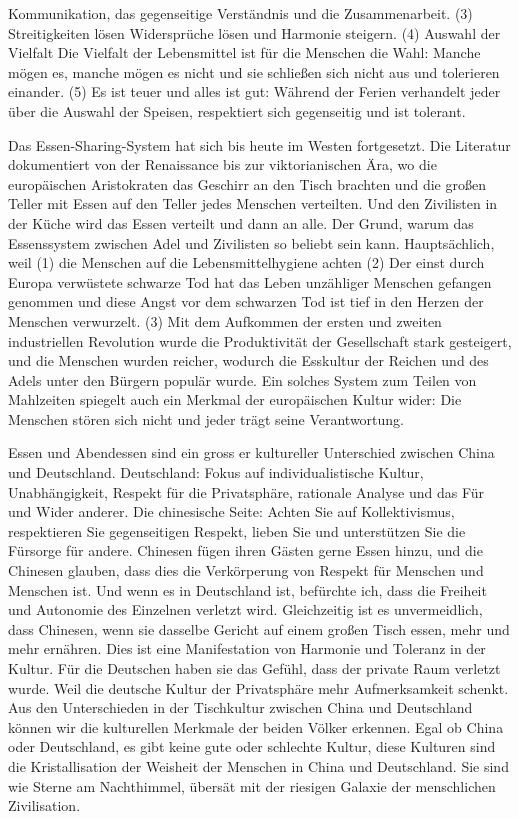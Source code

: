 Kommunikation, das gegenseitige Verständnis und die Zusammenarbeit. (3) Streitigkeiten lösen Widersprüche lösen und Harmonie steigern. (4) Auswahl der Vielfalt Die Vielfalt der Lebensmittel ist für die Menschen die Wahl: Manche mögen es, manche mögen es nicht und sie schließen sich nicht aus und tolerieren einander. (5) Es ist teuer und alles ist gut: Während der Ferien verhandelt jeder über die Auswahl der Speisen, respektiert sich gegenseitig und ist tolerant.
\par
Das Essen-Sharing-System hat sich bis heute im Westen fortgesetzt. Die Literatur dokumentiert von der Renaissance bis zur viktorianischen Ära, wo die europäischen Aristokraten das Geschirr an den Tisch brachten und die großen Teller mit Essen auf den Teller jedes Menschen verteilten. Und den Zivilisten in der Küche wird das Essen verteilt und dann an alle. Der Grund, warum das Essenssystem zwischen Adel und Zivilisten so beliebt sein kann. Hauptsächlich, weil (1) die Menschen auf die Lebensmittelhygiene achten (2) Der einst durch Europa verwüstete schwarze Tod hat das Leben unzähliger Menschen gefangen genommen und diese Angst vor dem schwarzen Tod ist tief in den Herzen der Menschen verwurzelt. (3) Mit dem Aufkommen der ersten und zweiten industriellen Revolution wurde die Produktivität der Gesellschaft stark gesteigert, und die Menschen wurden reicher, wodurch die Esskultur der Reichen und des Adels unter den Bürgern populär wurde. Ein solches System zum Teilen von Mahlzeiten spiegelt auch ein Merkmal der europäischen Kultur wider: Die Menschen stören sich nicht und jeder trägt seine Verantwortung.
\par
Essen und Abendessen sind ein gro\-ss er kultureller Unterschied zwischen China und Deutschland. Deutschland: Fokus auf individualistische Kultur, Unabhängigkeit, Respekt für die Privatsphäre, rationale Analyse und das Für und Wider anderer. Die chinesische Seite: Achten Sie auf Kollektivismus, respektieren Sie gegenseitigen Respekt, lieben Sie und unterstützen Sie die Fürsorge für andere. Chinesen fügen ihren Gästen gerne Essen hinzu, und die Chinesen glauben, dass dies die Verkörperung von Respekt für Menschen und Menschen ist. Und wenn es in Deutschland ist, befürchte ich, dass die Freiheit und Autonomie des Einzelnen verletzt wird. Gleichzeitig ist es unvermeidlich, dass Chinesen, wenn sie dasselbe Gericht auf einem großen Tisch essen, mehr und mehr ernähren. Dies ist eine Manifestation von Harmonie und Toleranz in der Kultur. Für die Deutschen haben sie das Gefühl, dass der private Raum verletzt wurde. Weil die deutsche Kultur der Privatsphäre mehr Aufmerksamkeit schenkt.
Aus den Unterschieden in der Tischkultur zwischen China und Deutschland können wir die kulturellen Merkmale der beiden Völker erkennen. Egal ob China oder Deutschland, es gibt keine gute oder schlechte Kultur, diese Kulturen sind die Kristallisation der Weisheit der Menschen in China und Deutschland. Sie sind wie Sterne am Nachthimmel, übersät mit der riesigen Galaxie der menschlichen Zivilisation.